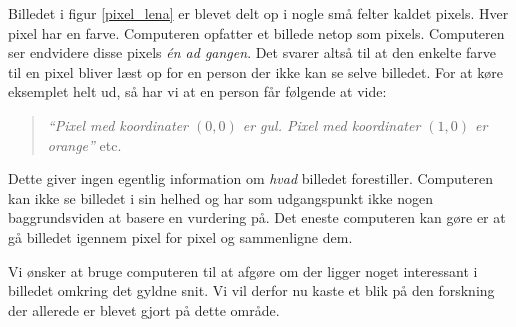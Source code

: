 {Billedet i figur \ref{pixel_lena} er blevet delt op i nogle små felter
kaldet pixels. Hver pixel har en farve. Computeren opfatter et billede
netop som pixels. Computeren ser endvidere disse pixels \emph{én ad
gangen}. Det svarer altså til at den enkelte farve til en pixel bliver
læst op for en person der ikke kan se selve billedet. For at køre
eksemplet helt ud, så har vi at en person får følgende at vide:
\begin{quote}
    \emph{``Pixel med koordinater $(0, 0)$ er gul. Pixel med
    koordinater $(1, 0)$ er orange''} etc.
\end{quote}
Dette giver ingen egentlig information om \emph{hvad} billedet
forestiller. Computeren kan ikke se billedet i sin helhed og har som
udgangspunkt ikke nogen baggrundsviden at basere en vurdering på. Det
eneste computeren kan gøre er at gå billedet igennem pixel for pixel og
sammenligne dem.

Vi ønsker at bruge computeren til at afgøre om der ligger noget
interessant i billedet omkring det gyldne snit. Vi vil derfor nu kaste
et blik på den forskning der allerede er blevet gjort på dette område.

}

